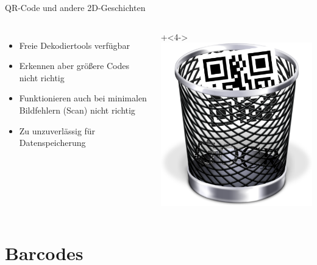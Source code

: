 \begin{frame}{QR-Code und andere 2D-Geschichten}
	\begin{columns}
		\begin{itemize}
		\item<+-> Freie Dekodiertools verfügbar
		\item<+-> Erkennen aber größere Codes nicht richtig
		\item<+-> Funktionieren auch bei minimalen Bildfehlern (Scan) nicht richtig
		\item<+-> Zu unzuverlässig für Datenspeicherung
		\end{itemize}
		\onslide+<4->\includegraphics[width=\textwidth]{penma/trashcans/qr.png}
	\end{columns}
\end{frame}

\section{Barcodes}

